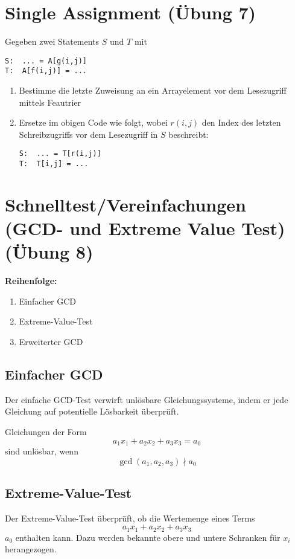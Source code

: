 \documentclass[a4paper,10pt]{article}
\begin{document}
\section{Single Assignment (Übung 7)}

Gegeben zwei Statements $S$ und $T$ mit
\begin{lstlisting}
S:  ... = A[g(i,j)]
T:  A[f(i,j)] = ...
\end{lstlisting}

\begin{enumerate}
    \item Bestimme die letzte Zuweisung an ein Arrayelement vor dem Lesezugriff mittels Feautrier
    \item Ersetze im obigen Code wie folgt, wobei $r(i,j)$ den Index des letzten Schreibzugriffs vor dem Lesezugriff in $S$ beschreibt:
\begin{lstlisting}
S:  ... = T[r(i,j)]
T:  T[i,j] = ...
\end{lstlisting}
\end{enumerate}

\section{Schnelltest/Vereinfachungen (GCD- und Extreme Value Test) (Übung 8)}

\textbf{Reihenfolge:}
\begin{enumerate}
    \item Einfacher GCD
    \item Extreme-Value-Test
    \item Erweiterter GCD
\end{enumerate}

\subsection{Einfacher GCD}

Der einfache GCD-Test verwirft unlösbare Gleichungssysteme, indem er jede Gleichung auf potentielle Lösbarkeit überprüft.

Gleichungen der Form
\[a_1x_1 + a_2x_2 + a_3x_3 = a_0\]
sind unlösbar, wenn
\[\gcd(a_1, a_2, a_3) \nmid a_0\]

\subsection{Extreme-Value-Test}

Der Extreme-Value-Test überprüft, ob die Wertemenge eines Terms
\[a_1x_1 + a_2x_2 + a_3x_3\]
$a_0$ enthalten kann. Dazu werden bekannte obere und untere Schranken für $x_i$ herangezogen.
\end{document}
